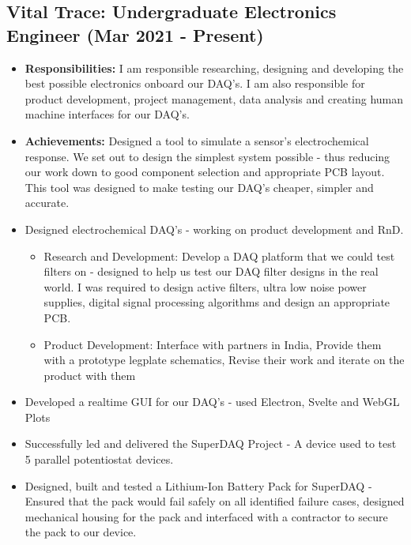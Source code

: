 \documentclass{article}[a4page]
\begin{document}
\subsection*{Vital Trace: Undergraduate Electronics Engineer (Mar 2021 - Present)}
\begin{itemize}
    \item \textbf{Responsibilities: } I am responsible researching, designing and developing the best possible electronics onboard our DAQ's. I am also responsible for product development, project management, data analysis and creating human machine interfaces for our DAQ's. 
    \item \textbf{Achievements: } Designed a tool to simulate a sensor's electrochemical response. We set out to design the simplest system possible - thus reducing our work down to good component selection and appropriate PCB layout. This tool was designed to make testing our DAQ's cheaper, simpler and accurate.
        \item Designed electrochemical DAQ's - working on product development and RnD.
        \begin{itemize}
            \item Research and Development: Develop a DAQ platform that we could test filters on - designed to help us test our DAQ filter designs in the real world. I was required to design active filters, ultra low noise power supplies, digital signal processing algorithms and design an appropriate PCB.
            \item Product Development: Interface with partners in India, Provide them with a prototype legplate schematics, Revise their work and iterate on the product with them
        \end{itemize}
        \item Developed a realtime GUI for our DAQ's - used Electron, Svelte and WebGL Plots
        \item Successfully led and delivered the SuperDAQ Project - A device used to test 5 parallel potentiostat devices.
        \item Designed, built and tested a Lithium-Ion Battery Pack for SuperDAQ - Ensured that the pack would fail safely on all identified failure cases, designed mechanical housing for the pack and interfaced with a contractor to secure the pack to our device.
\end{itemize}
\end{document}

